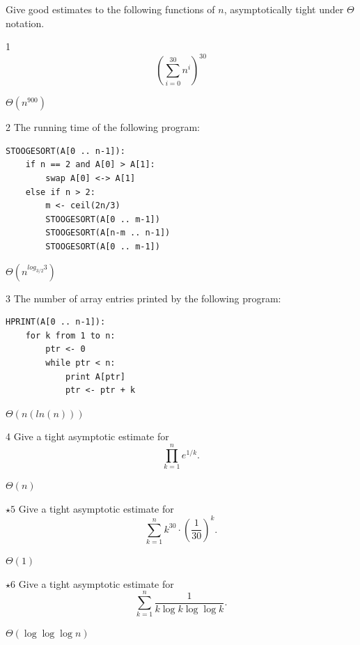 \documentclass[12pt]{article}
\begin{document}


Give good estimates to the following functions of $n$, asymptotically tight under $\Theta$ notation.

\begin{problem}{1}
\[
\left(\sum_{i=0}^{30} n^i \right)^{30}
\]
\end{problem}

\begin{solution}
    \bbni
    $\Theta(n^{900})$
\end{solution}

\begin{problem}{2}
The running time of the following program:
\begin{lstlisting}
STOOGESORT(A[0 .. n-1]):
    if n == 2 and A[0] > A[1]:
        swap A[0] <-> A[1]
    else if n > 2:
        m <- ceil(2n/3)
        STOOGESORT(A[0 .. m-1])
        STOOGESORT(A[n-m .. n-1])
        STOOGESORT(A[0 .. m-1])
\end{lstlisting}
\end{problem}

\begin{solution}
    \bbni 
    $\Theta\left (n^{log_{3/2}3} \right )$
\end{solution}

\begin{problem}{3}
The number of array entries printed by the following program:
\begin{lstlisting}
HPRINT(A[0 .. n-1]):
    for k from 1 to n:
        ptr <- 0
        while ptr < n:
            print A[ptr]
            ptr <- ptr + k
\end{lstlisting}
\end{problem}

\begin{solution}
    \bbni
    $\Theta(n(ln(n)))$
\end{solution}

\begin{problem}{4}
Give a tight asymptotic estimate for
\[
\prod_{k=1}^{n} e^{1/k}.
\]
\end{problem}

\begin{solution}
    \bbni
    $\Theta(n)$
\end{solution}


\begin{problem}{$\star 5$}
 Give a tight asymptotic estimate for
\[
\sum_{k=1}^{n} k^{30} \cdot \left(\frac{1}{30}\right)^k.
\]
\end{problem}

\begin{solution}
    \bbni
    $\Theta(1) $
\end{solution}

\begin{problem}{$\star 6$}
Give a tight asymptotic estimate for
\[
\sum_{k=1}^{n} \frac{1}{k \log k \log \log k}.
\]
\end{problem}

\begin{solution}
    \bbni
    $\Theta(\log \log \log n)$
\end{solution}
\end{document}

